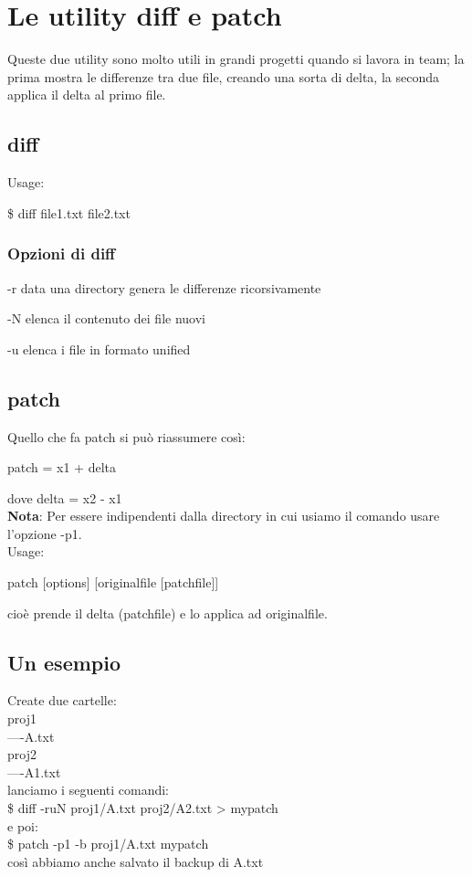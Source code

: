 \documentclass[a4paper,12pt]{article} %
\begin{document}
\section{Le utility diff e patch}
Queste due utility sono molto utili in grandi progetti quando si lavora in team; la prima mostra le differenze tra due file, creando una sorta di delta, la seconda applica il delta al primo file.
\subsection{diff}
Usage:\\
\begin{center}
\$ diff file1.txt file2.txt
\end{center}
\subsubsection{Opzioni di diff}
\begin{description}
\item -r data una directory genera le differenze ricorsivamente
\item -N elenca il contenuto dei file nuovi
\item -u elenca i file in formato unified
\end{description}
\subsection{patch}
Quello che fa patch si può riassumere così:
\begin{center}
patch = x1 + delta
\end{center}
dove delta = x2 - x1\\
\textbf{Nota}: Per essere indipendenti dalla directory in cui usiamo il comando usare l'opzione -p1.\\
Usage:\\
\begin{center}
patch [options] [originalfile [patchfile]]
\end{center}
cioè prende il delta (patchfile) e lo applica ad originalfile.
\subsection {Un esempio}
Create due cartelle:\\
proj1\\
----A.txt\\
proj2\\
----A1.txt\\

lanciamo i seguenti comandi:\\
\$ diff -ruN proj1/A.txt proj2/A2.txt > mypatch\\
e poi:\\
\$ patch -p1 -b proj1/A.txt mypatch\\

così abbiamo anche salvato il backup di A.txt
\end{document}
